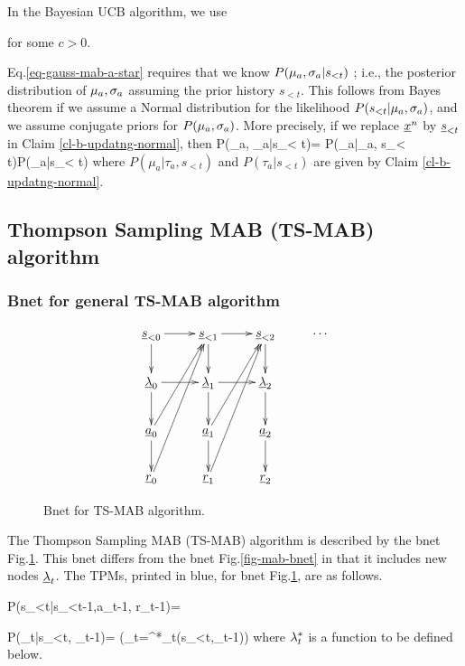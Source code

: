 In the Bayesian UCB algorithm, we use

\beq
{}
\label{eq-gauss-mab-a-star}
\eeq
for some $c>0$.

Eq.\ref{eq-gauss-mab-a-star}
requires that we know
 $P(\mu_a, \sigma_a|s_{< t})$
; i.e., the posterior distribution
of $\mu_a, \sigma_a$ assuming
the prior history $s_{< t}$.
This follows from Bayes theorem
if we assume a Normal distribution
for the likelihood $P(s_{< t}|\mu_a, \sigma_a)$,
and we assume
conjugate priors for $P(\mu_a, \sigma_a)$.
More precisely,
if we replace $\rvx^n$
by $\rvs_{< t}$
in Claim \ref{cl-b-updatng-normal},
then
\beq
P(\mu_a, \tau_a|s_{< t})=
P(\mu_a|\tau_a, s_{< t})P(\tau_a|s_{< t})
\eeq
where
$P(\mu_a|\tau_a, s_{< t})$
and $P(\tau_a|s_{< t})$
are given by 
Claim \ref{cl-b-updatng-normal}.



\subsection{Thompson Sampling MAB
 (TS-MAB)
algorithm}

\subsubsection{Bnet for general TS-MAB
algorithm}
\begin{figure}[h!]
$$\xymatrix{
\rvs_{<0}\ar[r]\ar[d]
&
\rvs_{<1}\ar[r]\ar[d]
&
\rvs_{<2}\ar[d]&\cdots
\\
\ul{\lam}_0\ar[d]\ar[r]
&\ul{\lam}_1\ar[d]\ar[r]
&\ul{\lam}_2\ar[d]
\\
\rva_0\ar[uur]\ar[d]&
\rva_1\ar[uur]\ar[d]&
\rva_2\ar[d]
\\
\rvr_0\ar[uuur]&
\rvr_1\ar[uuur]&
\rvr_2
}$$
\caption{Bnet for TS-MAB
 algorithm.}
\label{fig-bnet-thom-mab}
\end{figure}
The Thompson Sampling MAB (TS-MAB)
algorithm is described by
the bnet 
Fig.\ref{fig-bnet-thom-mab}.
This bnet differs from the bnet
Fig.\ref{fig-mab-bnet}
in that it
includes new nodes $\ul{\lam}_t$.
The TPMs, printed in blue,
for bnet
Fig.\ref{fig-bnet-thom-mab}, 
are as follows.

\beq\color{blue}
P(s_{<t}|s_{<t-1},a_{t-1}, r_{t-1})=
\eeq

\beq\color{blue}
P(\lam_t|s_{<t}, \lam_{t-1})=
\indi(\lam_t=\lam^*_t(s_{<t},\lam_{t-1}))
\eeq
where $\lambda^*_t$ is a function
to be defined below.

